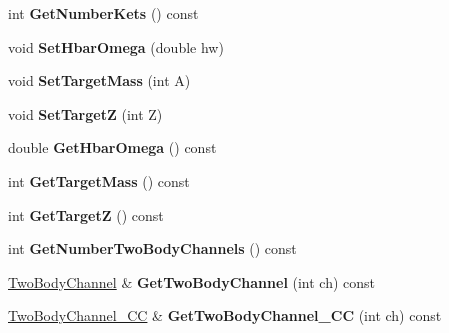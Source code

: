 \begin{DoxyCompactItemize}
\item 
\hypertarget{classModelSpace_a2a46d43beb6d4e2de8c978ff921f4047}{int {\bfseries Get\-Number\-Kets} () const }\label{classModelSpace_a2a46d43beb6d4e2de8c978ff921f4047}

\item 
\hypertarget{classModelSpace_abc4f6a563b71977d1e0a99eb5367a2d7}{void {\bfseries Set\-Hbar\-Omega} (double hw)}\label{classModelSpace_abc4f6a563b71977d1e0a99eb5367a2d7}

\item 
\hypertarget{classModelSpace_ab29013a1b7b4b8b26d5905f97c135931}{void {\bfseries Set\-Target\-Mass} (int A)}\label{classModelSpace_ab29013a1b7b4b8b26d5905f97c135931}

\item 
\hypertarget{classModelSpace_a7ad596c6f8c6c850672e1699b12901e4}{void {\bfseries Set\-Target\-Z} (int Z)}\label{classModelSpace_a7ad596c6f8c6c850672e1699b12901e4}

\item 
\hypertarget{classModelSpace_a4cf15b20d8262cdab4ab1cadd412de7f}{double {\bfseries Get\-Hbar\-Omega} () const }\label{classModelSpace_a4cf15b20d8262cdab4ab1cadd412de7f}

\item 
\hypertarget{classModelSpace_a2f6a8428767c064a63796d4fc010e41e}{int {\bfseries Get\-Target\-Mass} () const }\label{classModelSpace_a2f6a8428767c064a63796d4fc010e41e}

\item 
\hypertarget{classModelSpace_ac467562b5c207d25cddc71c4da6a702b}{int {\bfseries Get\-Target\-Z} () const }\label{classModelSpace_ac467562b5c207d25cddc71c4da6a702b}

\item 
\hypertarget{classModelSpace_a7c0b9152d68e069f9774078bd2a429b7}{int {\bfseries Get\-Number\-Two\-Body\-Channels} () const }\label{classModelSpace_a7c0b9152d68e069f9774078bd2a429b7}

\item 
\hypertarget{classModelSpace_ab2c315fd347fe93dd63246dea3d02f35}{\hyperlink{classTwoBodyChannel}{Two\-Body\-Channel} \& {\bfseries Get\-Two\-Body\-Channel} (int ch) const }\label{classModelSpace_ab2c315fd347fe93dd63246dea3d02f35}

\item 
\hypertarget{classModelSpace_a6709279838180ef0a6745320c9ad6926}{\hyperlink{classTwoBodyChannel__CC}{Two\-Body\-Channel\-\_\-\-C\-C} \& {\bfseries Get\-Two\-Body\-Channel\-\_\-\-C\-C} (int ch) const }\label{classModelSpace_a6709279838180ef0a6745320c9ad6926}


\end{DoxyCompactItemize}
